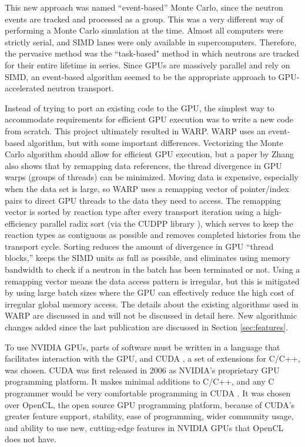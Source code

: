 \documentclass[preprint,12pt]{elsarticle}
\begin{document}
This new approach was named ``event-based'' Monte Carlo, since the neutron events are tracked and processed as a group.  This was a very different way of performing a Monte Carlo simulation at the time.  Almost all computers were strictly serial, and SIMD lanes were only available in supercomputers.  Therefore, the pervasive method was the ``task-based" method in which neutrons are tracked for their entire lifetime in series.  Since GPUs are massively parallel and rely on SIMD, an event-based algorithm seemed to be the appropriate approach to GPU-accelerated neutron transport.  

Instead of trying to port an existing code to the GPU, the simplest way to accommodate requirements for efficient GPU execution was to write a new code from scratch.  This project ultimately resulted in WARP.  WARP uses an event-based algorithm, but with some important differences.  Vectorizing the Monte Carlo algorithm should allow for efficient GPU execution, but a paper by Zhang \cite{on_the_fly_remapping} also shows that by remapping data references, the thread divergence in GPU warps (groups of threads) can be minimized. Moving data is expensive, especially when the data set is large, so WARP uses a remapping vector of pointer/index pairs to direct GPU threads to the data they need to access.  The remapping vector is sorted  by reaction type after every transport iteration using a high-efficiency parallel radix sort (via the CUDPP library \cite{CUDPP}), which serves to keep the reaction types as contiguous as possible and removes completed histories from the transport cycle.  Sorting reduces the amount of divergence in GPU ``thread blocks,'' keeps the SIMD units as full as possible, and eliminates using memory bandwidth to check if a neutron in the batch has been terminated or not.  Using a remapping vector means the data access pattern is irregular, but this is mitigated by using large batch sizes where the GPU can effectively reduce the high cost of irregular global memory access.  The details about the existing algorithms used in WARP are discussed in \cite{algorithms} and will not be discussed in detail here.  New algorithmic changes added since the last publication are discussed in Section \ref{sec:features}.

To use NVIDIA GPUs, parts of software must be written in a language that facilitates interaction with the GPU, and CUDA \cite{cuda}, a set of extensions for C/C++, was chosen.  CUDA was first released in 2006 as NVIDIA's proprietary GPU programming platform.  It makes minimal additions to C/C++, and any C programmer would be very comfortable programming in CUDA \cite{cuda}.  It was chosen over OpenCL, the open source GPU programming platform, because of CUDA's greater feature support, stability, ease of programming, wider community usage, and ability to use new, cutting-edge features in NVIDIA GPUs that OpenCL does not have.
\end{document}
